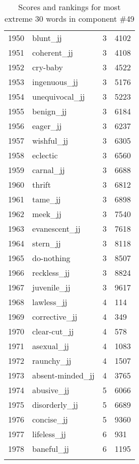 \begin{longtable}[!htbp]{| rlr@{.}l |}
    1950 & blunt\_jj & 3 & 4102 \\
    1951 & coherent\_jj & 3 & 4108 \\
    1952 & cry-baby & 3 & 4522 \\
    1953 & ingenuous\_jj & 3 & 5176 \\
    1954 & unequivocal\_jj & 3 & 5223 \\
    1955 & benign\_jj & 3 & 6184 \\
    1956 & eager\_jj & 3 & 6237 \\
    1957 & wishful\_jj & 3 & 6305 \\
    1958 & eclectic & 3 & 6560 \\
    1959 & carnal\_jj & 3 & 6688 \\
    1960 & thrift & 3 & 6812 \\
    1961 & tame\_jj & 3 & 6898 \\
    1962 & meek\_jj & 3 & 7540 \\
    1963 & evanescent\_jj & 3 & 7618 \\
    1964 & stern\_jj & 3 & 8118 \\
    1965 & do-nothing & 3 & 8507 \\
    1966 & reckless\_jj & 3 & 8824 \\
    1967 & juvenile\_jj & 3 & 9617 \\
    1968 & lawless\_jj & 4 & 114 \\
    1969 & corrective\_jj & 4 & 349 \\
    1970 & clear-cut\_jj & 4 & 578 \\
    1971 & asexual\_jj & 4 & 1083 \\
    1972 & raunchy\_jj & 4 & 1507 \\
    1973 & absent-minded\_jj & 4 & 3765 \\
    1974 & abusive\_jj & 5 & 6066 \\
    1975 & disorderly\_jj & 5 & 6689 \\
    1976 & concise\_jj & 5 & 9360 \\
    1977 & lifeless\_jj & 6 & 931 \\
    1978 & baneful\_jj & 6 & 1195 \\
    \hline
    \caption{Scores and rankings for most extreme 30 words in component \#49} \\
\end{longtable}
